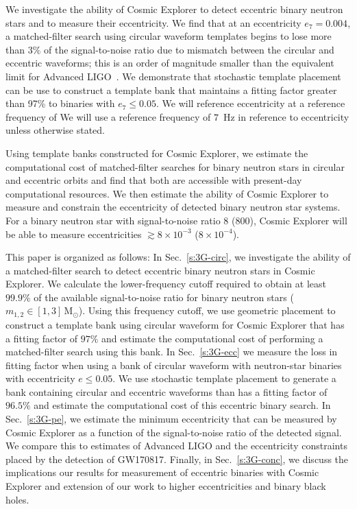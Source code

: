 We investigate the ability of Cosmic Explorer to detect eccentric binary neutron stars and to measure their eccentricity. We find that at an eccentricity $e_{7} = 0.004$, a matched-filter search using circular waveform templates begins to lose more than $3\%$ of the signal-to-noise ratio due to mismatch between the circular and eccentric waveforms; this is an order of magnitude smaller than the equivalent limit for Advanced LIGO~\cite{Brown:2009ng,Huerta:2013qb}. We demonstrate that stochastic template placement \cite{Harry:2009ea,Manca:2009xw} can be use to construct a template bank that maintains a fitting factor greater than 97\% to binaries with $e_{7} \le 0.05$. We will reference eccentricity at a reference frequency of We will use a reference frequency of $7$~Hz in reference to eccentricity unless otherwise stated.

Using template banks constructed for Cosmic Explorer, we estimate the computational cost of matched-filter searches for binary neutron stars in circular and eccentric orbits and find that both are accessible with present-day computational resources. We then estimate the ability of Cosmic Explorer to measure and constrain the eccentricity of detected binary neutron star systems. For a binary neutron star with signal-to-noise ratio 8 (800), Cosmic Explorer will be able to measure eccentricities $\gtrsim 8\times 10^{-3}$ ($8\times 10^{-4}$). 

This paper is organized as follows: In Sec.~\ref{s:3G-circ}, we investigate the ability of a matched-filter search to detect eccentric binary neutron stars in Cosmic Explorer. We calculate the lower-frequency cutoff required to obtain at least $99.9\%$ of the available signal-to-noise ratio for binary neutron stars ($m_{1,2} \in [1,3]\,\mathrm{M}_\odot$). Using this frequency cutoff, we use geometric placement to construct a template bank using circular waveform for Cosmic Explorer that has a fitting factor of $97\%$ and estimate the computational cost of performing a matched-filter search using this bank. In Sec.~\ref{s:3G-ecc} we measure the loss in fitting factor when using a bank of circular waveform with neutron-star binaries with eccentricity $e \le 0.05$. We use stochastic template placement to generate a bank containing circular and eccentric waveforms than has a fitting factor of $96.5\%$ and estimate the computational cost of this eccentric binary search. In Sec.~\ref{s:3G-pe}, we estimate the minimum eccentricity that can be measured by Cosmic Explorer as a function of the signal-to-noise ratio of the detected signal. We compare this to estimates of Advanced LIGO and the eccentricity constraints placed by the detection of GW170817. Finally, in Sec.~\ref{s:3G-conc}, we discuss the implications our results for measurement of eccentric binaries with Cosmic Explorer and extension of our work to higher eccentricities and binary black holes.


